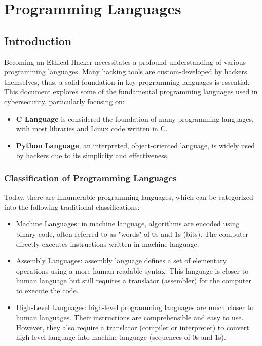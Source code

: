 \section{Programming Languages}
\subsection{Introduction}
Becoming an Ethical Hacker necessitates a profound understanding of various programming languages. Many hacking tools are custom-developed by hackers themselves, thus, a solid foundation in key programming languages is essential. This document explores some of the fundamental programming languages used in cybersecurity, particularly focusing on:

\begin{itemize}
    \item \textbf{C Language} is considered the foundation of many programming languages, with most libraries and Linux code written in C.
    \item \textbf{Python Language}, an interpreted, object-oriented language, is widely used by hackers due to its simplicity and effectiveness.
\end{itemize}

\subsubsection{Classification of Programming Languages}
Today, there are innumerable programming languages, which can be categorized into the following traditional classifications:
\begin{itemize}
    \item Machine Languages: in machine language, algorithms are encoded using binary code, often referred to as "words" of 0s and 1s (bits). The computer directly executes instructions written in machine language.
    \item Assembly Languages: assembly language defines a set of elementary operations using a more human-readable syntax. This language is closer to human language but still requires a translator (assembler) for the computer to execute the code.
    \item High-Level Languages: high-level programming languages are much closer to human languages. Their instructions are comprehensible and easy to use. However, they also require a translator (compiler or interpreter) to convert high-level language into machine language (sequences of 0s and 1s).
\end{itemize}

